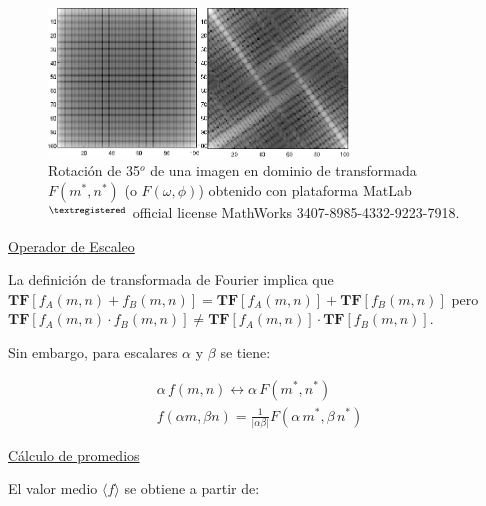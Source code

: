 
\begin{center}
\begin{figure} [h!]

\centering
\includegraphics[width=8cm]{figures/Fig2_7.png}

\caption{Rotaci\'on de 35$^{o}$ de una imagen en dominio de transformada $F(m^*, n^*)$ (o $F(\omega, \phi)$)
         obtenido con plataforma MatLab$^{\textregistered}$ official license MathWorks 3407-8985-4332-9223-7918.}
\label{Fig2_7}

\end{figure}
\end{center}



\underline{Operador de Escaleo}

\vspace{0.5cm}

La definici\'on de transformada de Fourier implica que $\mathbf{TF} [f_{A}(m, n) + f_{B}(m, n)] =
\mathbf{TF} [f_{A}(m, n)] + \mathbf{TF}[f_{B}(m, n)]$ pero $\mathbf{TF} [f_{A}(m, n) \cdot f_{B}(m, n)] \neq
\mathbf{TF} [f_{A}(m, n)] \cdot \mathbf{TF}[f_{B}(m, n)]$.
%

%
Sin embargo, para escalares $\alpha$ y $\beta$ se tiene:

\begin{eqnarray}
	\alpha \, f(m, n) \leftrightarrow \alpha \, F(m^*, n^*) \\
	f(\alpha m, \beta n) = \frac{1}{\lvert \alpha \beta \rvert}
	F(\alpha \, m^*, \beta \, n^*)
\label{EqLXII}
\end{eqnarray}


\vspace{1.0cm}

\underline{C\'alculo de promedios}

\vspace{0.5cm}

El valor medio $\langle f \rangle$ se obtiene a partir de:

